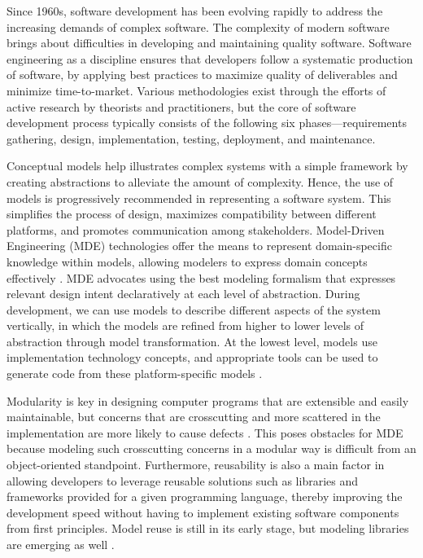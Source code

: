 Since 1960s, software development has been evolving rapidly to address the increasing demands of complex software. The complexity of modern software brings about difficulties in developing and maintaining quality software. Software engineering as a discipline ensures that developers follow a systematic production of software, by applying best practices to maximize quality of deliverables and minimize time-to-market. Various methodologies exist through the efforts of active research by theorists and practitioners, but the core of software development process typically consists of the following six phases---requirements gathering, design, implementation, testing, deployment, and maintenance.

Conceptual models help illustrates complex systems with a simple framework by creating abstractions to alleviate the amount of complexity. Hence, the use of models is progressively recommended in representing a software system. This simplifies the process of design, maximizes compatibility between different platforms, and promotes communication among stakeholders. Model-Driven Engineering (MDE) technologies offer the means to represent domain-specific knowledge within models, allowing modelers to express domain concepts effectively \cite{schmidt2006model}. MDE advocates using the best modeling formalism that expresses relevant design intent declaratively at each level of abstraction. During development, we can use models to describe different aspects of the system vertically, in which the models are refined from higher to lower levels of abstraction through model transformation. At the lowest level, models use implementation technology concepts, and appropriate tools can be used to generate code from these platform-specific models \cite{sendall2003model}.

Modularity is key in designing computer programs that are extensible and easily maintainable, but concerns that are crosscutting and more scattered in the implementation are more likely to cause defects \cite{eaddy2008crosscutting}. This poses obstacles for MDE because modeling such crosscutting concerns in a modular way is difficult from an object-oriented standpoint. Furthermore, reusability is also a main factor in allowing developers to leverage reusable solutions such as libraries and frameworks provided for a given programming language, thereby improving the development speed without having to implement existing software components from first principles. Model reuse is still in its early stage, but modeling libraries are emerging as well \cite{france2012repository}.

